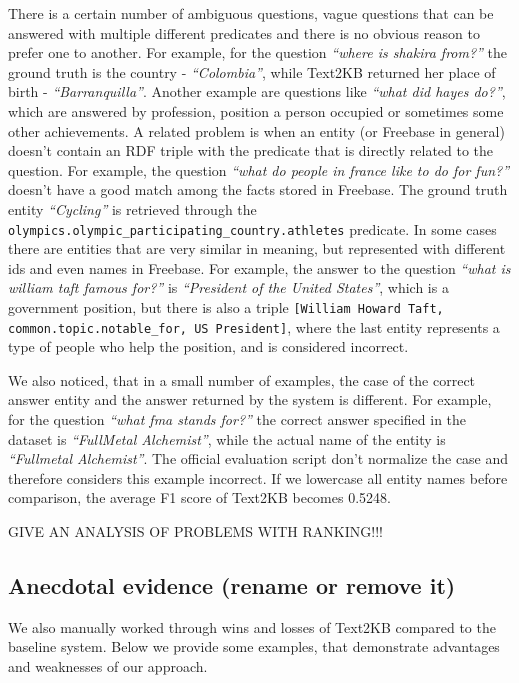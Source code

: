There is a certain number of ambiguous questions, \ie vague questions that can be answered with multiple different predicates and there is no obvious reason to prefer one to another.
For example, for the question \textit{``where is shakira from?''} the ground truth is the country - \textit{``Colombia''}, while Text2KB returned her place of birth - \textit{``Barranquilla''}.
Another example are questions like \textit{``what did hayes do?''}, which are answered by profession, position a person occupied or sometimes some other achievements.
A related problem is when an entity (or Freebase in general) doesn't contain an RDF triple with the predicate that is directly related to the question.
For example, the question \textit{``what do people in france like to do for fun?''} doesn't have a good match among the facts stored in Freebase.
The ground truth entity \textit{``Cycling''} is retrieved through the \texttt{olympics.olympic\_participating\_country.athletes} predicate.
In some cases there are entities that are very similar in meaning, but represented with different ids and even names in Freebase.
For example, the answer to the question \textit{``what is william taft famous for?''} is \textit{``President of the United States''}, which is a government position, but there is also a triple \texttt{[William Howard Taft, common.topic.notable\_for, US President]}, where the last entity represents a type of people who help the position, and is considered incorrect.

We also noticed, that in a small number of examples, the case of the correct answer entity and the answer returned by the system is different.
For example, for the question \textit{``what fma stands for?''} the correct answer specified in the dataset is \textit{``FullMetal Alchemist''}, while the actual name of the entity is \textit{``Fullmetal Alchemist''}.
The official evaluation script don't normalize the case and therefore considers this example incorrect.
If we lowercase all entity names before comparison, the average F1 score of Text2KB becomes 0.5248.

GIVE AN ANALYSIS OF PROBLEMS WITH RANKING!!!

\subsection{Anecdotal evidence (rename or remove it)}

We also manually worked through wins and losses of Text2KB compared to the baseline system.
Below we provide some examples, that demonstrate advantages and weaknesses of our approach.

